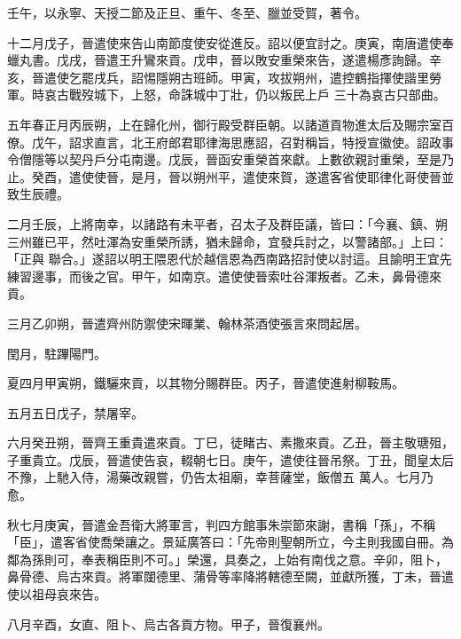 \begin{pinyinscope}
 壬午，以永寧、天授二節及正旦、重午、冬至、臘並受賀，著令。



 十二月戊子，晉遣使來告山南節度使安從進反。詔以便宜討之。庚寅，南唐遣使奉蠟丸書。戊戌，晉遣王升鸞來貢。戊申，晉以敗安重榮來告，遂遣楊彥詢歸。辛亥，晉遣使乞罷戌兵，詔惕隱朔古班師。甲寅，攻拔朔州，遣控鶴指揮使諧里勞軍。時哀古戰歿城下，上怒，命誅城中丁壯，仍以叛民上戶
 三十為哀古只部曲。



 五年春正月丙辰朔，上在歸化州，御行殿受群臣朝。以諸道貢物進太后及賜宗室百僚。戊午，詔求直言，北王府郎君耶律海思應詔，召對稱旨，特授宣徽使。詔政事令僧隱等以契丹戶分屯南邊。戊辰，晉函安重榮首來獻。上數欲親討重榮，至是乃止。癸酉，遣使使晉，是月，晉以朔州平，遣使來賀，遂遣客省使耶律化哥使晉並致生辰禮。



 二月壬辰，上將南幸，以諸路有未平者，召太子及群臣議，皆曰：「今襄、鎮、朔三州雖已平，然吐渾為安重榮所誘，猶未歸命，宜發兵討之，以警諸部。」上曰：「正與
 聯合。」遂詔以明王隈恩代於越信恩為西南路招討使以討這。且諭明王宜先練習邊事，而後之官。甲午，如南京。遣使使晉索吐谷渾叛者。乙未，鼻骨德來貢。



 三月乙卯朔，晉遣齊州防禦使宋暉業、翰林茶酒使張言來問起居。



 閏月，駐蹕陽門。



 夏四月甲寅朔，鐵驪來貢，以其物分賜群臣。丙子，晉遣使進射柳鞍馬。



 五月五日戊子，禁屠宰。



 六月癸丑朔，晉齊王重貴遣來貢。丁巳，徒睹古、素撒來貢。乙丑，晉主敬瑭殂，子重貴立。戊辰，晉遣使告哀，輟朝七日。庚午，遣使往晉吊祭。丁丑，聞皇太后不豫，上馳入侍，湯藥改親嘗，仍告太祖廟，幸菩薩堂，飯僧五
 萬人。七月乃愈。



 秋七月庚寅，晉遣金吾衛大將軍言，判四方館事朱崇節來謝，書稱「孫」，不稱「臣」，遣客省使喬榮讓之。景延廣答曰：「先帝則聖朝所立，今主則我國自冊。為鄰為孫則可，奉表稱臣則不可。」榮還，具奏之，上始有南伐之意。辛卯，阻卜，鼻骨德、烏古來貢。將軍闥德里、蒲骨等率降將轄德至闕，並獻所獲，丁未，晉遣使以祖母哀來告。



 八月辛酉，女直、阻卜、烏古各貢方物。甲子，晉復襄州。




\end{pinyinscope}
